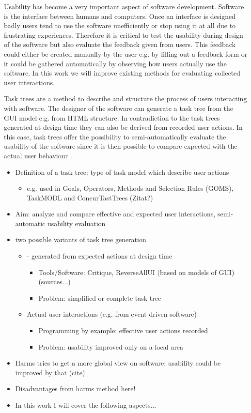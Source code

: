 Usability has become a very important aspect of software development. 
Software is the interface between humans and computers. 
Once an interface is designed badly users tend to use the software unefficiently or stop using it at all due to frustrating experiences.
Therefore it is critical to test the usability during design of the software but also evaluate the feedback given from users. 
This feedback could either be created manually by the user e.g. by filling out a feedback form or it could be gathered automatically by observing how users actually use the software.
In this work we will improve existing methods for evaluating collected user interactions.

Task trees are a method to describe and structure the process of users interacting with software. 
The designer of the software can generate a task tree from the GUI model e.g. from HTML structure. 
In contradiction to the task trees generated at design time they can also be derived from recorded user actions. 
In this case, task trees offer the possibility to semi-automatically evaluate the usability of the software since it is then possible to compare expected with the actual user behaviour \citep{harms2013}.  

\begin{itemize}
	\item Definition of a task tree: type of task model which describe user actions
    	\begin{itemize}
		\item  e.g. used in Goals, Operators, Methods and Selection Rules (GOMS), TaskMODL and ConcurTastTrees (Zitat?)
	\end{itemize}
	\item Aim: analyze and compare effective and expected user interactions, semi-automatic usability evaluation
	\item two possible variants of task tree generation 
 	\begin{itemize}
		\item - generated from expected actions at design time
      		\begin{itemize}
			\item Tools/Software: Critique, ReverseAllUI (based on models of GUI) (sources...)
     			\item Problem: simplified or complete task tree
		\end{itemize}
		\item Actual user interactions (e.g. from event driven software)
     		\begin{itemize} 
			\item Programming by example: effective user actions recorded
			\item Problem: usability improved only on a local area
		\end{itemize}
	\end{itemize}
	\item Harms tries to get a more global view on software: usability could be improved by that (cite) 
	\item Disadvantages from harms method here!
	\item In this work I will cover the following aspects...
\end{itemize}


